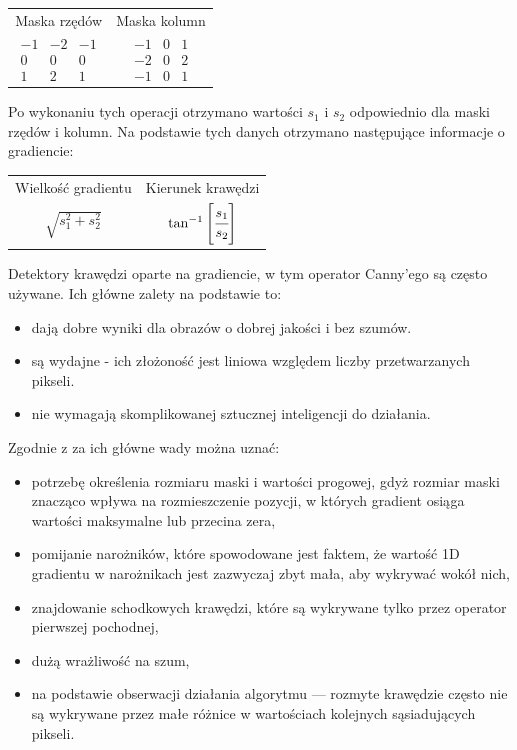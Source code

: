 \documentclass[a4paper,11pt,twoside,openright]{report}
\theoremstyle{definition}
\begin{document}
\begin{table}[h!]
\centering
\begin{tabular} { c c }
  Maska rzędów & Maska kolumn \\
$
\begin{matrix}
-1 & -2 & -1 \\
0 & 0 & 0 \\
1 & 2 & 1
\end{matrix}$
&
$\begin{matrix}
-1 & 0 & 1 \\
-2 & 0 & 2 \\
-1 & 0 & 1
\end{matrix}$
\end{tabular}
\end{table}

Po wykonaniu tych operacji otrzymano wartości $s_1$ i $s_2$ odpowiednio dla maski rzędów i kolumn. Na podstawie tych danych otrzymano następujące informacje o gradiencie:
\begin{table}[h!]
\centering
\begin{tabular} { c c }
  Wielkość gradientu & Kierunek krawędzi \\
$\sqrt{s_1^2 + s_2^2}$ & $\tan^{-1} \Bigg[ {\cfrac{s_1}{s_2}} \Bigg]$
\end{tabular}
\end{table}

Detektory krawędzi oparte na gradiencie, w tym operator Canny'ego są często używane. Ich główne zalety na podstawie \cite{Cyfrowe przetwarzanie obrazów medycznych} to:
\begin{itemize}[noitemsep]
\item dają dobre wyniki dla obrazów o dobrej jakości i bez szumów.
\item są wydajne - ich złożoność jest liniowa względem liczby przetwarzanych pikseli.
\item nie wymagają skomplikowanej sztucznej inteligencji do działania.
\end{itemize}

Zgodnie z \cite{Cyfrowe przetwarzanie obrazów medycznych} za ich główne wady można uznać:
\begin{itemize}[noitemsep]
\item potrzebę określenia rozmiaru maski i wartości progowej, gdyż rozmiar maski znacząco wpływa na rozmieszczenie pozycji, w których gradient osiąga wartości maksymalne lub przecina zera,
\item pomijanie narożników, które spowodowane jest faktem, że wartość 1D gradientu w narożnikach jest zazwyczaj zbyt mała, aby wykrywać wokół nich,
\item znajdowanie schodkowych krawędzi, które są wykrywane tylko przez operator pierwszej pochodnej,
\item dużą wrażliwość na szum,
\item na podstawie obserwacji działania algorytmu --- rozmyte krawędzie często nie są wykrywane przez małe różnice w wartościach kolejnych sąsiadujących pikseli.
\end{itemize}
\end{document}
